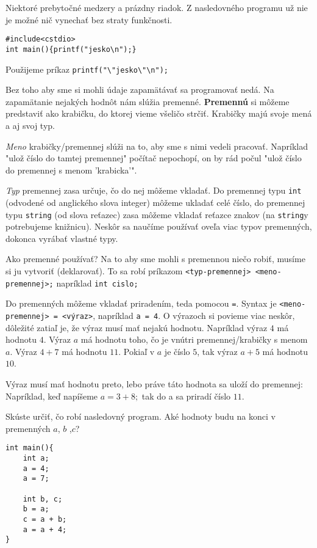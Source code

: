 \riesenie Niektoré prebytočné medzery a prázdny riadok. Z nasledovného
programu už nie je možné nič vynechať bez straty funkčnosti.
\begin{lstlisting}
#include<cstdio>
int main(){printf("jesko\n");}
\end{lstlisting}

\riesenie Použijeme príkaz \verb!printf("\"jesko\"\n");!


Bez toho aby sme si mohli údaje zapamätávať sa programovať nedá. Na zapamätanie
nejakých hodnôt nám slúžia premenné. \textbf{Premennú} si môžeme predstaviť ako
krabičku, do ktorej vieme všeličo strčiť. Krabičky majú svoje mená a aj svoj
typ. 

\emph{Meno} krabičky/premennej slúži na to, aby sme s nimi vedeli pracovať.
Napríklad "ulož číslo do tamtej premennej" počítač nepochopí, on by rád počul
"ulož číslo do premennej s menom 'krabicka'". 

\emph{Typ} premennej zasa určuje, čo do nej môžeme vkladať. Do premennej typu
\verb!int! (odvodené od anglického slova integer) môžeme ukladať celé číslo, do
premennej typu \verb!string! (od slova reťazec) zasa môžeme vkladať reťazce
znakov (na \verb!string!y potrebujeme knižnicu). Neskôr sa naučíme používať
oveľa viac typov premenných, dokonca vyrábať vlastné typy.

\medskip

Ako premenné používať? Na to aby sme mohli s premennou niečo robiť, musíme si
ju vytvoriť (deklarovať). To sa robí príkazom \verb!<typ-premennej> <meno-premennej>;!
napríklad \verb!int cislo;! 

Do premenných môžeme vkladať priradením, teda pomocou \verb'='. Syntax je
\verb!<meno-premennej> = <výraz>!, napríklad \verb!a = 4!. O výrazoch si
povieme viac neskôr, dôležité zatiaľ je, že výraz musí mať nejakú hodnotu.
Napríklad výraz $4$ má hodnotu $4$. Výraz $a$ má hodnotu toho, čo je vnútri
premennej/krabičky s menom $a$.  Výraz $4 + 7$ má hodnotu $11$. Pokiaľ v $a$ je
číslo $5$, tak výraz $a + 5$ má hodnotu $10$.

Výraz musí mať hodnotu preto, lebo práve táto hodnota sa uloží do premennej:
Napríklad, keď napíšeme $a = 3 + 8;$ tak do a sa priradí číslo $11$.

\cvicenie Skúste určiť, čo robí nasledovný program. Aké hodnoty budu na
konci v premenných $a$, $b$ ,$c$?
\begin{lstlisting}
int main(){
    int a;
    a = 4;
    a = 7;

    int b, c;
    b = a;
    c = a + b;
    a = a + 4;
}
\end{lstlisting}

